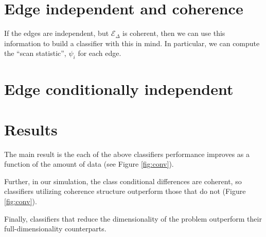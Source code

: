 \documentclass{article}
\newcommand{\mE}{\mathcal{E}}
\newcommand{\mED}{\mE_{\Delta}}
\begin{document}

\section{Edge independent and coherence} %
\label{sub:edge_independent_and_coherence}

If the edges are independent, but $\mED$ is coherent, then we can use this information to build a classifier with this in mind.  In particular, we can compute the ``scan statistic'', $\psi_i$ for each edge.  






\section{Edge conditionally independent} %
\label{sub:edge_cond}




\section{Results} %
\label{sec:results}


The main result is the each of the above classifiers performance improves as a function of the amount of data (see Figure \ref{fig:conv}).  

Further, in our simulation, the class conditional differences are coherent, so classifiers utilizing coherence structure outperform those that do not (Figure \ref{fig:conv}).  

Finally, classifiers that reduce the dimensionality of the problem outperform their full-dimensionality counterparts.
\end{document}
